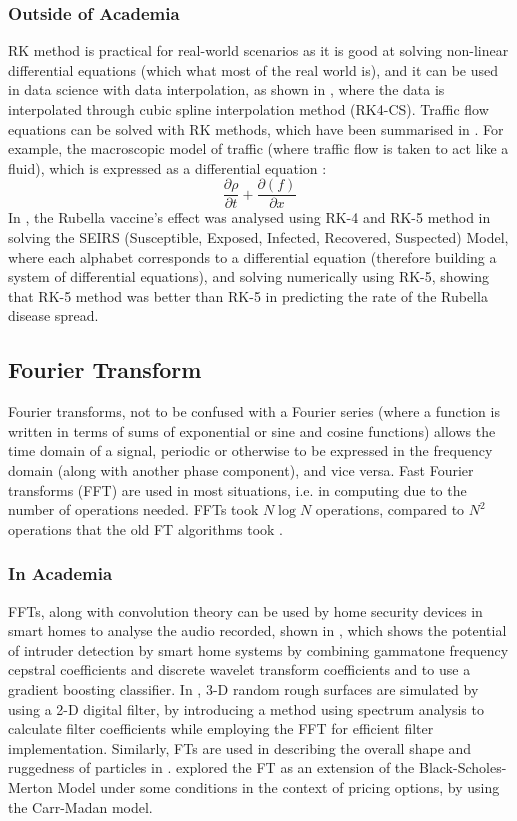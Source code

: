 \documentclass[a4paper, 10pt, conference]{ieeeconf}      %
\begin{document}
\subsubsection{Outside of Academia} %
RK method is practical for real-world scenarios as it is good at solving non-linear differential equations (which what most of the real world is), and it can be used in data science with data interpolation, as shown in \cite{Karim2018}, where the data is interpolated through cubic spline interpolation method (RK4-CS). Traffic flow equations can be solved with RK methods, which have been summarised in \cite{Naja2022}. For example, the macroscopic model of traffic (where traffic flow is taken to act like a fluid), which is expressed as a differential equation \cite{Lighthill1955}\cite{Nagatani2002}: 
\begin{equation}
    \frac{\partial{\rho}}{\partial{t}} + \frac{\partial(f)}{\partial{x}}
\end{equation}
In \cite{Asri2021}, the Rubella vaccine's effect was analysed using RK-4 and RK-5 method in solving the SEIRS (Susceptible, Exposed, Infected, Recovered, Suspected) Model, where each alphabet corresponds to a differential equation (therefore building a system of differential equations), and solving numerically using RK-5, showing that RK-5 method was better than RK-5 in predicting the rate of the Rubella disease spread. 

\subsection{Fourier Transform} %
Fourier transforms, not to be confused with a Fourier series (where a function is written in terms of sums of exponential or sine and cosine functions) allows the time domain of a signal, periodic or otherwise to be expressed in the frequency domain (along with another phase component), and vice versa. Fast Fourier transforms (FFT) are used in most situations, i.e. in computing due to the number of operations needed. FFTs took $N\log{N}$ operations, compared to $N^2$ operations that the old FT algorithms took \cite{Cooley1969}.

\subsubsection{In Academia} %
FFTs, along with convolution theory can be used by home security devices in smart homes to analyse the audio recorded, shown in \cite{Vadeiadis2020}, which shows the potential of intruder detection by smart home systems by combining gammatone frequency cepstral coefficients and discrete wavelet transform coefficients and to use a gradient boosting classifier. In \cite{Hu1992}, 3-D random rough surfaces are simulated by using a 2-D digital filter, by introducing a method using spectrum analysis to calculate filter coefficients while employing the FFT for efficient filter implementation. Similarly, FTs are used in describing the overall shape and ruggedness of particles in \cite{Wettimuny2004}. \cite{Orzechowski2019} explored the FT as an extension of the Black-Scholes-Merton Model \cite{black1973pricing} under some conditions in the context of pricing options, by using the Carr-Madan model.
\end{document}
